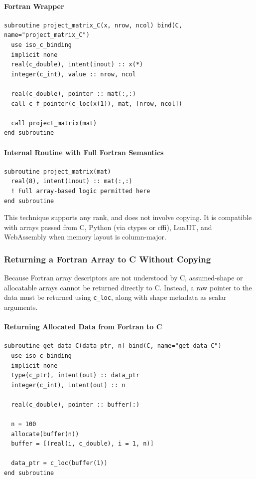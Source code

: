 \documentclass{article}
\begin{document}
\paragraph{Fortran Wrapper}

\begin{verbatim}
subroutine project_matrix_C(x, nrow, ncol) bind(C, name="project_matrix_C")
  use iso_c_binding
  implicit none
  real(c_double), intent(inout) :: x(*)
  integer(c_int), value :: nrow, ncol

  real(c_double), pointer :: mat(:,:)
  call c_f_pointer(c_loc(x(1)), mat, [nrow, ncol])

  call project_matrix(mat)
end subroutine
\end{verbatim}

\paragraph{Internal Routine with Full Fortran Semantics}

\begin{verbatim}
subroutine project_matrix(mat)
  real(8), intent(inout) :: mat(:,:)
  ! Full array-based logic permitted here
end subroutine
\end{verbatim}

This technique supports any rank, and does not involve copying. It is compatible with arrays passed from C, Python (via ctypes or cffi), LuaJIT, and WebAssembly when memory layout is column-major.

\subsubsection{Returning a Fortran Array to C Without Copying}

Because Fortran array descriptors are not understood by C, assumed-shape or allocatable arrays cannot be returned directly to C. Instead, a raw pointer to the data must be returned using \texttt{c\_loc}, along with shape metadata as scalar arguments.

\paragraph{Returning Allocated Data from Fortran to C}

\begin{verbatim}
subroutine get_data_C(data_ptr, n) bind(C, name="get_data_C")
  use iso_c_binding
  implicit none
  type(c_ptr), intent(out) :: data_ptr
  integer(c_int), intent(out) :: n

  real(c_double), pointer :: buffer(:)

  n = 100
  allocate(buffer(n))
  buffer = [(real(i, c_double), i = 1, n)]

  data_ptr = c_loc(buffer(1))
end subroutine
\end{verbatim}
\end{document}
